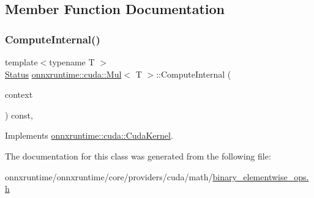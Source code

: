 \subsection{Member Function Documentation}
\mbox{\label{classonnxruntime_1_1cuda_1_1Mul_acad0d0361e14828dec11252cbd07fead}} 
\subsubsection{\texorpdfstring{Compute\+Internal()}{ComputeInternal()}}
{\footnotesize\ttfamily template$<$typename T $>$ \\
\mbox{\hyperlink{classonnxruntime_1_1common_1_1Status}{Status}} \mbox{\hyperlink{classonnxruntime_1_1cuda_1_1Mul}{onnxruntime\+::cuda\+::\+Mul}}$<$ T $>$\+::Compute\+Internal (\begin{DoxyParamCaption}\item[{\mbox{\hyperlink{classonnxruntime_1_1OpKernelContext}{Op\+Kernel\+Context}} $\ast$}]{context }\end{DoxyParamCaption}) const\hspace{0.3cm}{\ttfamily [override]}, {\ttfamily [virtual]}}



Implements \mbox{\hyperlink{classonnxruntime_1_1cuda_1_1CudaKernel_aca7af04ae448017d6023d30bba231ebb}{onnxruntime\+::cuda\+::\+Cuda\+Kernel}}.



The documentation for this class was generated from the following file\+:\begin{DoxyCompactItemize}
\item 
onnxruntime/onnxruntime/core/providers/cuda/math/\mbox{\hyperlink{binary__elementwise__ops_8h}{binary\+\_\+elementwise\+\_\+ops.\+h}}\end{DoxyCompactItemize}
